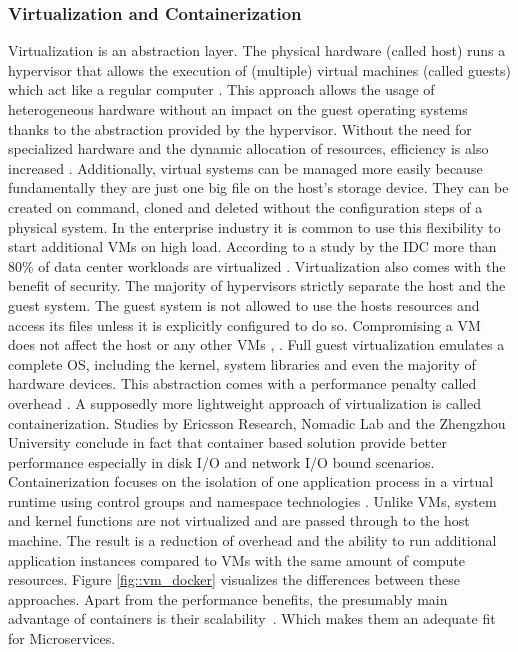 \documentclass[12pt, a4paper]{article}
\begin{document}
        \subsubsection{Virtualization and Containerization}
        Virtualization is an abstraction layer. The physical hardware (called host) runs a hypervisor that allows the execution of (multiple) virtual machines (called guests) which act like a regular computer \cite{vmbasics}. This approach allows the usage of heterogeneous hardware without an impact on the guest operating systems thanks to the abstraction provided by the hypervisor. Without the need for specialized hardware and the dynamic allocation of resources, efficiency is also increased \cite{redhat_venv}. Additionally, virtual systems can be managed more easily because fundamentally they are just one big file on the host's storage device. They can be created on command, cloned and deleted without the configuration steps of a physical system. In the enterprise industry it is common to use this flexibility to start additional \ac{VM}s on high load. According to a study by the \ac{IDC} more than 80\% of data center workloads are virtualized \cite{virtualaddoption}. Virtualization also comes with the benefit of security. The majority of hypervisors strictly separate the host and the guest system. The guest system is not allowed to use the hosts resources and access its files unless it is explicitly configured to do so. Compromising a \ac{VM} does not affect the host or any other \ac{VM}s \cite{vmbasics}, \cite{redhat_venv}.\newline
        Full guest virtualization emulates a complete \ac{OS}, including the kernel, system libraries and even the majority of hardware devices. This abstraction comes with a performance penalty called overhead \cite{vmbasics}. A supposedly more lightweight approach of virtualization is called containerization. Studies by Ericsson Research, Nomadic Lab \cite{ieee_perfomance} and the Zhengzhou University \cite{zhengzhou_university} conclude in fact that container based solution provide better performance especially in disk \acs{I/O} and network \acs{I/O} bound scenarios. Containerization focuses on the isolation of one application process in a virtual runtime using control groups and namespace technologies \cite{cgroups}. Unlike \ac{VM}s, system and kernel functions are not virtualized and are passed through to the host machine. The result is a reduction of overhead and the ability to run additional application instances compared to \ac{VM}s with the same amount of compute resources. Figure \ref{fig::vm_docker} visualizes the differences between these approaches.\newline
        Apart from the performance benefits, the presumably main advantage of containers is their scalability~\cite{cintainer_scale}. Which makes them an adequate fit for Microservices.
\end{document}
